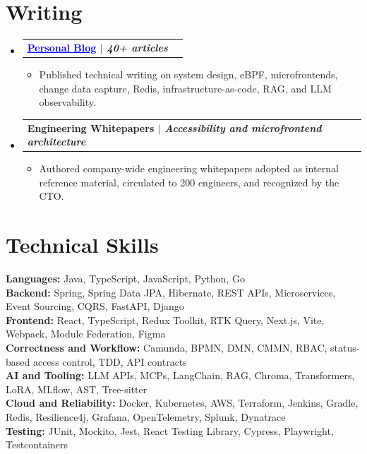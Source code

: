 \documentclass[letterpaper,11pt]{article}
\makeatletter
\newcommand{\resumeItem}[1]{
  \item\small{
    {#1 \vspace{-3pt}}
  }
}
\newcommand{\resumeProjectHeading}[2]{
  \vspace{-3pt}\item
    \begin{tabular*}{1.0\textwidth}[t]{l@{\extracolsep{\fill}}r}
      \textbf{#1} & \textbf{\small #2} \\
    \end{tabular*}\vspace{-7pt}
}
\newcommand{\projectLink}[2]{\href{#1}{\textcolor{blue}{\underline{#2}}}}
\newcommand{\resumeSubHeadingListStart}{\begin{itemize}[leftmargin=0.0in, label={}]}
\newcommand{\resumeSubHeadingListEnd}{\end{itemize}}
\newcommand{\resumeItemListStart}{\begin{itemize}}
\newcommand{\resumeItemListEnd}{\end{itemize}\vspace{0pt}}
\makeatother
\begin{document}
\section{Writing}
\resumeSubHeadingListStart
    \resumeProjectHeading
      {\projectLink{https://aymanace2049.hashnode.dev}{Personal Blog} \emph{$|$ 40+ articles}}{}
      \resumeItemListStart
        \resumeItem{Published technical writing on system design, eBPF, microfrontends, change data capture, Redis, infrastructure-as-code, RAG, and LLM observability.}
      \resumeItemListEnd
    \resumeProjectHeading
      {Engineering Whitepapers \emph{$|$ Accessibility and microfrontend architecture}}{}
      \resumeItemListStart
        \resumeItem{Authored company-wide engineering whitepapers adopted as internal reference material, circulated to 200 engineers, and recognized by the CTO.}
      \resumeItemListEnd
\resumeSubHeadingListEnd

\section{Technical Skills}
\vspace{-7pt}
\begin{itemize}
[leftmargin=0.15in, label={}]\small{\item{
\textbf{Languages:} Java, TypeScript, JavaScript, Python, Go \\
\textbf{Backend:} Spring, Spring Data JPA, Hibernate, REST APIs, Microservices, Event Sourcing, CQRS, FastAPI, Django \\
\textbf{Frontend:} React, TypeScript, Redux Toolkit, RTK Query, Next.js, Vite, Webpack, Module Federation, Figma \\
\textbf{Correctness and Workflow:} Camunda, BPMN, DMN, CMMN, RBAC, status-based access control, TDD, API contracts \\
\textbf{AI and Tooling:} LLM APIs, MCPs, LangChain, RAG, Chroma, Transformers, LoRA, MLflow, AST, Tree-sitter \\
\textbf{Cloud and Reliability:} Docker, Kubernetes, AWS, Terraform, Jenkins, Gradle, Redis, Resilience4j, Grafana, OpenTelemetry, Splunk, Dynatrace \\
\textbf{Testing:} JUnit, Mockito, Jest, React Testing Library, Cypress, Playwright, Testcontainers
}}
\end{itemize}
\end{document}
